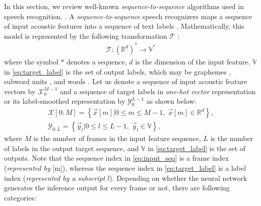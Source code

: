 \documentclass{article}
\begin{document}
In this section, we review well-known {\it sequence-to-sequence} algorithms
used in speech recognition.
\cite{
j_chorowski_nips_2015_00, 
a_graves_corr_2012_00, 
y_he_icassp_2019_00,
r_prabhavalkar_interspeech_2017_00}. 
A {\it sequence-to-sequence}
speech recognizers maps a sequence of input acoustic features into a sequence 
of text labels  \cite{r_prabhavalkar_interspeech_2017_00}. 
Mathematically, this model is 
represented by the following transformation $\mathcal{T}$ 
\cite{a_graves_icml_2006_00}:
\begin{align}
  \mathcal{T} : \left(\mathbb{R}^d\right)^{*} \rightarrow \mathbb{V}^{*}
	\label{eq:transformation}
\end{align}
where the symbol ${*}$ denotes a sequence, $d$ is the dimension of the input 
feature. $\mathbb{V}$ in \eqref{eq:target_label} is the set of output
labels, which may be graphemes 
\cite{j_chorowski_nips_2015_00,
w_chan_icassp_2016_00},
subword units \cite{
a_zeyer_interspeech_2018_00,
c_chiu_icassp_2018_00},
 and words \cite{h_soltau_interspeech_2017_00}.
Let us denote a sequence of input acoustic feature vectors by 
$\mathcal{X}_{0}^{M-1}$ and a sequence of target labels in 
{\it one-hot vector} representation or its label-smoothed 
representation \cite{} by 
$\mathcal{Y}_{0}^{L-1}$ as shown below:
\begin{subequations}
  \begin{align}
    \mathcal{X}[0:M]  =  
      \left\{\vec{x}[m]
          \Big| 0 \le m \le M - 1, \; \vec{x}[m] \in \mathbb{R}^d \right\},  
    \label{eq:input_seq} \\
    \mathcal{Y}_{0:L}  =  
      \left\{\vec{y}_l  \Big| 0 \le l \le L-1, \; \vec{y}_l \in \mathbb{V} \right\}, 
    \label{eq:target_label}
  \end{align}
\end{subequations}
where $M$ is the number of frames in the input feature sequence,
$L$ is the number of labels in the output target sequence,
 and $\mathbb{V}$ in \eqref{eq:target_label} is the set of outputs.
Note that the sequence index in \eqref{eq:input_seq} is a frame
index ({\it represented by} [m]), 
whereas the sequence index in \eqref{eq:target_label} is 
a label index ({\it represented by a subscript} $l$). 
Depending on whether the neural network generates
the inference output for every frame or not, there are following
categories:
\end{document}
